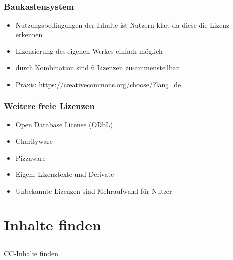 \documentclass[table]{beamer}
\begin{document}
\begin{frame}
    \frametitle{Baukastensystem}
    \begin{itemize}
        \item<1-> Nutzungsbedingungen der Inhalte ist Nutzern klar, da diese die Lizenz erkennen
        \item<2-> Lizensierung des eigenen Werkes einfach möglich
        \item<3-> durch Kombination sind 6 Lizenzen zusammenstellbar
        \item<4-> Praxis: \url{https://creativecommons.org/choose/?lang=de}
    \end{itemize}
\end{frame}

\begin{frame}
    \frametitle{Weitere freie Lizenzen}
    \begin{itemize}
        \item<2-> Open Database License (ODbL)
        \item<3-> Charityware
        \item<4-> Pizzaware
        \item<5-> Eigene Lizenztexte und Derivate
        \item<6-> Unbekannte Lizenzen sind Mehraufwand für Nutzer
    \end{itemize}
\end{frame}

\section{Inhalte finden}
\subsection{}

\begin{frame}
    \begin{center}\Large
    CC-Inhalte finden
    \end {center}
\end{frame}
\end{document}
